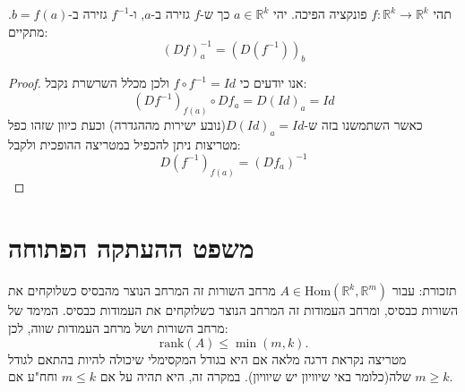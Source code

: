 \documentclass{tstextbook}
\begin{document}
\begin{proposition}
תהי \(f:\mathbb{R}^k\to\mathbb{R}^k\) פונקציה הפיכה. יהי \(a\in \mathbb{R}^k\) כך ש-\(f\) גזירה ב-\(a\), ו-\(f^{-1}\) גזירה ב-\(b=f(a)\). מתקיים:
$$\left(D f\right)_{a}^{-1}=\left(D\left(f^{-1}\right)\right)_{b}$$

\end{proposition}
\begin{proof}
אנו יודעים כי \(f\circ f^{-1}=Id\) ולכן מכלל השרשרת נקבל:
$$(Df^{-1})_{f(a)}\circ Df_{a}=D(Id)_{a}=Id$$
כאשר השתמשנו בזה ש-\(D(Id)_{a}=Id\)(נובע ישירות מההגדרה) וכעת כיוון שזהו כפל מטריצות ניתן להכפיל במטריצה ההופכית ולקבל:
$$D(f^{-1})_{f(a)}=(D f_{a})^{-1}$$

\end{proof}
\section{משפט ההעתקה הפתוחה}

תזכורת: עבור \(A\in \mathrm{Hom}\left( \mathbb{R}^k,\mathbb{R}^m \right)\) מרחב השורות זה המרחב הנוצר מהבסיס כשלוקחים את השורות כבסיס, ומרחב העמודות זה המרחב הנוצר כשלוקחים את העמודות כבסיס. המימד של מרחב השורות ושל מרחב העמודות שווה, לכן:
$$\mathrm{rank}(A)\leq\operatorname*{min}(m,k).$$
מטריצה נקראת דרגה מלאה אם היא בגודל המקסימלי שיכולה להיות בהתאם לגודל שלה(כלומר באי שיוויון יש שיוויון). במקרה זה, היא תהיה על אם \(m\leq k\) וחח"ע אם \(m\geq k\).
\end{document}
